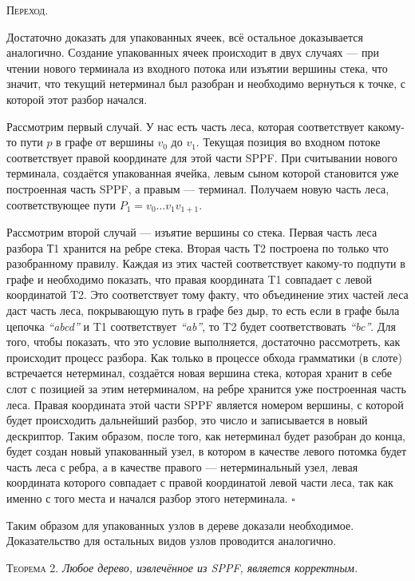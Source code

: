 \textsc{Переход.}

Достаточно доказать для упакованных ячеек, всё остальное доказывается аналогично. Создание упакованных ячеек происходит в двух случаях --- при чтении нового терминала из входного потока или изъятии вершины стека, что значит, что текущий нетерминал был разобран и необходимо вернуться к точке, с которой этот разбор начался. 

Рассмотрим первый случай. У нас есть часть леса, которая соответствует какому-то пути $p$ в графе от вершины $v_0$ до $v_1$. Текущая позиция во входном потоке соответствует правой координате для этой части SPPF. При считывании нового терминала, создаётся упакованная ячейка, левым сыном которой становится уже построенная часть SPPF, а правым --- терминал. Получаем новую часть леса, соответствующее пути $P_1 = v_0 \dots v_1 v_{1+1}$.

Рассмотрим второй случай --- изъятие вершины со стека. Первая часть леса разбора Т1 хранится на ребре стека. Вторая часть Т2 построена по только что разобранному правилу. Каждая из этих частей соответствует какому-то подпути в графе и необходимо показать, что правая координата T1 совпадает с левой координатой T2. Это соответствует тому факту, что объединение этих частей леса даст часть леса, покрывающую путь в графе без дыр, то есть если в графе была цепочка {\it ``abcd''} и T1 соответствует {\it ``ab''}, то T2 будет соответствовать {\it ``bc''}. Для того, чтобы показать, что это условие выполняется, достаточно рассмотреть, как происходит процесс разбора. Как только в процессе обхода грамматики (в слоте) встречается нетерминал, создаётся новая вершина стека, которая хранит в себе слот с позицией за этим нетерминалом, на ребре хранится уже построенная часть леса. Правая координата этой части SPPF является номером вершины, с которой будет происходить дальнейший разбор, это число и записывается в новый дескриптор. Таким образом, после того, как нетерминал будет разобран до конца, будет создан новый упакованный узел, в котором в качестве левого потомка будет часть леса с ребра, а в качестве правого --- нетерминальный узел, левая координата которого совпадает с правой координатой левой части леса, так как именно с того места и начался разбор этого нетерминала. $\square$

Таким образом для упакованных узлов в дереве доказали необходимое. Доказательство для остальных видов узлов проводится аналогично.

\textsc{Теорема 2.} 
\textit{Любое дерево, извлечённое из SPPF, является корректным.}

